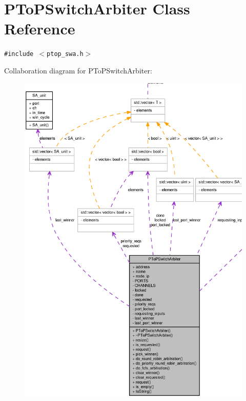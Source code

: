 \section{PToPSwitchArbiter Class Reference}
\label{classPToPSwitchArbiter}
{\tt \#include $<$ptop\_\-swa.h$>$}

Collaboration diagram for PToPSwitchArbiter:\nopagebreak
\begin{figure}[H]
\begin{center}
\leavevmode
\includegraphics[width=400pt]{classPToPSwitchArbiter__coll__graph}
\end{center}
\end{figure}
